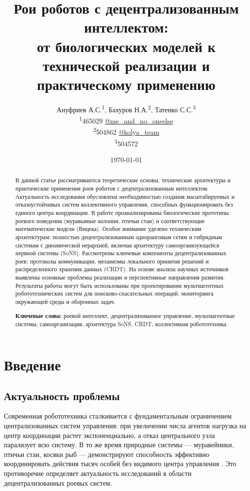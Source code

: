 \documentclass[12pt, a4paper]{article}
\title{Рои роботов с децентрализованным интеллектом: \\
       \large от биологических моделей к технической реализации и практическому применению}
\author{Ануфриев А.С.\textsuperscript{1}, Бахуров Н.А.\textsuperscript{2}, Татенко С.С.\textsuperscript{3} \\
        \small \textsuperscript{1}465029 \href{https://t.me/me_and_no_oneelse}{@me\_and\_no\_oneelse} \\
        \small \textsuperscript{2}504862 \href{https://t.me/kolya_team}{@kolya\_team} \\
        \small \textsuperscript{3}504572 }
\date{\today}
\begin{document}
\maketitle

\begin{abstract}
В данной статье рассматриваются теоретические основы, технические архитектуры и практические применения роев роботов с децентрализованным интеллектом. Актуальность исследования обусловлена необходимостью создания масштабируемых и отказоустойчивых систем коллективного управления, способных функционировать без единого центра координации. В работе проанализированы биологические прототипы роевого поведения (муравьиные колонии, птичьи стаи) и соответствующие математические модели (Вицека). Особое внимание уделено техническим архитектурам: полностью децентрализованным одноранговым сетям и гибридным системам с динамической иерархией, включая архитектуру самоорганизующейся нервной системы (SoNS). Рассмотрены ключевые компоненты децентрализованных роев: протоколы коммуникации, механизмы локального принятия решений и распределенного хранения данных (CRDT). На основе анализа научных источников выявлены основные проблемы реализации и перспективные направления развития. Результаты работы могут быть использованы при проектировании мультиагентных робототехнических систем для поисково-спасательных операций, мониторинга окружающей среды и оборонных задач.

\textbf{Ключевые слова:} роевой интеллект, децентрализованное управление, мультиагентные системы, самоорганизация, архитектура SoNS, CRDT, коллективная робототехника.
\end{abstract}

\newpage

\section{Введение}

\subsection{Актуальность проблемы}
Современная робототехника сталкивается с фундаментальным ограничением централизованных систем управления: при увеличении числа агентов нагрузка на центр координации растет экспоненциально, а отказ центрального узла парализует всю систему. В то же время природные системы — муравейники, птичьи стаи, косяки рыб — демонстрируют способность эффективно координировать действия тысяч особей без видимого центра управления \cite{duan2023}. Это противоречие определяет актуальность исследований в области децентрализованных роевых систем.
\end{document}

